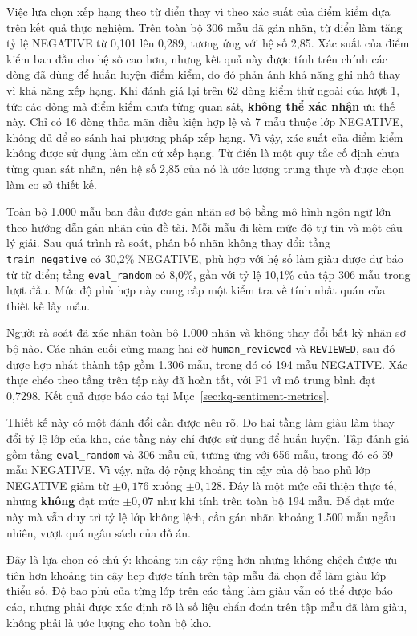 \documentclass[12pt, a4paper, oneside]{report}
\begin{document}
Việc lựa chọn xếp hạng theo từ điển thay vì theo xác suất của điểm kiểm dựa trên kết quả thực nghiệm. Trên toàn bộ 306 mẫu đã gán nhãn, từ điển làm tăng tỷ lệ NEGATIVE từ 0,101 lên 0,289, tương ứng với hệ số 2,85. Xác suất của điểm kiểm ban đầu cho hệ số cao hơn, nhưng kết quả này được tính trên chính các dòng đã dùng để huấn luyện điểm kiểm, do đó phản ánh khả năng ghi nhớ thay vì khả năng xếp hạng. Khi đánh giá lại trên 62 dòng kiểm thử ngoài của lượt 1, tức các dòng mà điểm kiểm chưa từng quan sát, \textbf{không thể xác nhận} ưu thế này. Chỉ có 16 dòng thỏa mãn điều kiện hợp lệ và 7 mẫu thuộc lớp NEGATIVE, không đủ để so sánh hai phương pháp xếp hạng. Vì vậy, xác suất của điểm kiểm không được sử dụng làm căn cứ xếp hạng. Từ điển là một quy tắc cố định chưa từng quan sát nhãn, nên hệ số 2,85 của nó là ước lượng trung thực và được chọn làm cơ sở thiết kế.

Toàn bộ 1.000 mẫu ban đầu được gán nhãn sơ bộ bằng mô hình ngôn ngữ lớn theo hướng dẫn gán nhãn của đề tài. Mỗi mẫu đi kèm mức độ tự tin và một câu lý giải. Sau quá trình rà soát, phân bố nhãn không thay đổi: tầng \texttt{train\_negative} có 30,2\% NEGATIVE, phù hợp với hệ số làm giàu được dự báo từ từ điển; tầng \texttt{eval\_random} có 8,0\%, gần với tỷ lệ 10,1\% của tập 306 mẫu trong lượt đầu. Mức độ phù hợp này cung cấp một kiểm tra về tính nhất quán của thiết kế lấy mẫu.

Người rà soát đã xác nhận toàn bộ 1.000 nhãn và không thay đổi bất kỳ nhãn sơ bộ nào. Các nhãn cuối cùng mang hai cờ \texttt{human\_reviewed} và \texttt{REVIEWED}, sau đó được hợp nhất thành tập gồm 1.306 mẫu, trong đó có 194 mẫu NEGATIVE. Xác thực chéo theo tầng trên tập này đã hoàn tất, với F1 vĩ mô trung bình đạt 0,7298. Kết quả được báo cáo tại Mục~\ref{sec:kq-sentiment-metrics}.

Thiết kế này có một đánh đổi cần được nêu rõ. Do hai tầng làm giàu làm thay đổi tỷ lệ lớp của kho, các tầng này chỉ được sử dụng để huấn luyện. Tập đánh giá gồm tầng \texttt{eval\_random} và 306 mẫu cũ, tương ứng với 656 mẫu, trong đó có 59 mẫu NEGATIVE. Vì vậy, nửa độ rộng khoảng tin cậy của độ bao phủ lớp NEGATIVE giảm từ $\pm0{,}176$ xuống $\pm0{,}128$. Đây là một mức cải thiện thực tế, nhưng \textbf{không} đạt mức $\pm0{,}07$ như khi tính trên toàn bộ 194 mẫu. Để đạt mức này mà vẫn duy trì tỷ lệ lớp không lệch, cần gán nhãn khoảng 1.500 mẫu ngẫu nhiên, vượt quá ngân sách của đồ án.

Đây là lựa chọn có chủ ý: khoảng tin cậy rộng hơn nhưng không chệch được ưu tiên hơn khoảng tin cậy hẹp được tính trên tập mẫu đã chọn để làm giàu lớp thiểu số. Độ bao phủ của từng lớp trên các tầng làm giàu vẫn có thể được báo cáo, nhưng phải được xác định rõ là số liệu chẩn đoán trên tập mẫu đã làm giàu, không phải là ước lượng cho toàn bộ kho.
\end{document}

